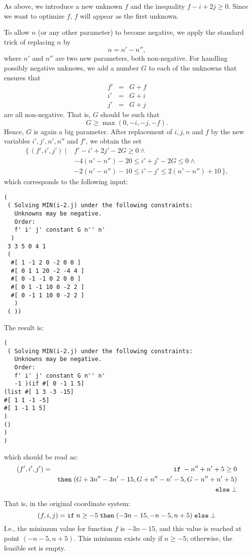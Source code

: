 \documentclass[12pt,a4paper,dvips]{article}
\begin{document}
As above,
we introduce a new unknown $f$ and the inequality $f-i+2j \geq
0$. Since we want to optimize $f$, $f$ will appear
as the first unknown.

To allow $n$ (or any other parameter) to become negative, 
we apply the standard trick of
replacing $n$ by $$n = n' - n'',$$ where $n'$ and $n''$ are two new
parameters, both non-negative.
For handling possibly negative unknows, we add a number $G$ to each of the
unknowns that ensures that
\begin{eqnarray*}
f' &=& G + f \\
i' &=& G + i \\
j' &=& G + j
\end{eqnarray*}
are all non-negative. That is, $G$ should be such that
$$
G \ge \max(0,-i,-j,-f).
$$
Hence, $G$
is again a big parameter. 
After replacement of $i,j,n$ and $f$ by the new variables
$i',j',n',n''$ and $f'$, we obtain the set
\begin{equation*}
\begin{aligned}
\{\,
(f',i',j') \mid {}
& f' -i' + 2j' - 2 G \ge 0 \wedge {} \\
& -4 (n'-n'') -20 \le i' + j' - 2 G \le 0 \wedge {} \\
& -2 (n'-n'') - 10 \le i' - j' \le 2 (n'-n'') + 10
\,\},
\end{aligned}
\end{equation*}
which corresponds to the following input:
\begin{verbatim}
( 
 ( Solving MIN(i-2.j) under the following constraints:
   Unknowns may be negative.
   Order:
   f' i' j' constant G n'' n'
  )
 3 3 5 0 4 1
 ( 
  #[ 1 -1 2 0 -2 0 0 ]
  #[ 0 1 1 20 -2 -4 4 ]
  #[ 0 -1 -1 0 2 0 0 ]
  #[ 0 1 -1 10 0 -2 2 ]
  #[ 0 -1 1 10 0 -2 2 ]
   )
 ( ))
\end{verbatim}

The result is:
\begin{verbatim}
( 
 ( Solving MIN(i-2.j) under the following constraints:
   Unknowns may be negative.
   Order:
   f' i' j' constant G n'' n'
   -1 )(if #[ 0 -1 1 5]
(list #[ 1 3 -3 -15]
#[ 1 1 -1 -5]
#[ 1 -1 1 5]
)
()
)
)
\end{verbatim}
which should be read as:
\begin{eqnarray*}
 (f',i',j') & = & {\tt if}\;  -n''+n'+5 \geq 0 \\
            &   & {\tt then} \; (G+3n''-3n'-15, G+n''-n'-5,G-n''+n'+5) \\
            &   & {\tt else} \; \bot
\end{eqnarray*}
That is, in the original coordinate system:
\[ (f,i,j) = {\tt if}\;  n \geq -5 \; {\tt then} \; (-3n-15, -n-5, n+5)
 \; {\tt else} \; \bot \]
I.e., the minimum value for function $f$ is $-3n-15$, and this value
is reached at point $(-n-5, n+5)$. This minimum exists only if $n \ge -5$;
otherwise, the feasible set is empty.
\end{document}

